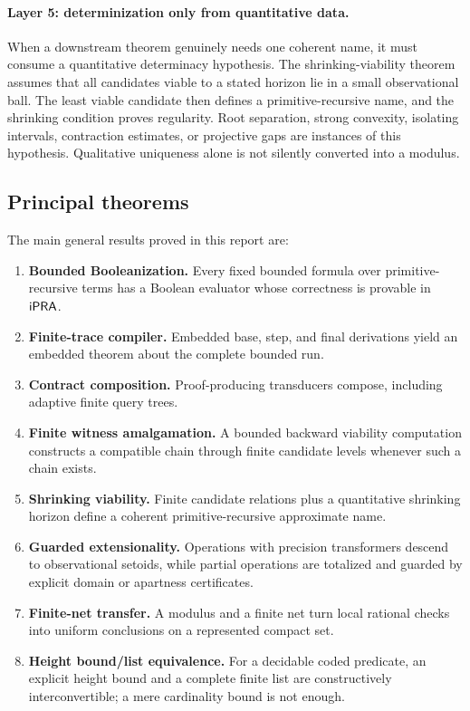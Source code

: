 \paragraph{Layer 5: determinization only from quantitative data.}
When a downstream theorem genuinely needs one coherent name, it must consume a
quantitative determinacy hypothesis.  The shrinking-viability theorem assumes
that all candidates viable to a stated horizon lie in a small observational
ball.  The least viable candidate then defines a primitive-recursive name, and
the shrinking condition proves regularity.  Root separation, strong convexity,
isolating intervals, contraction estimates, or projective gaps are instances
of this hypothesis.  Qualitative uniqueness alone is not silently converted
into a modulus.

\subsection{Principal theorems}

The main general results proved in this report are:

\begin{enumerate}[label=\textbf{T\arabic*.},leftmargin=4em]
\item \textbf{Bounded Booleanization.} Every fixed bounded formula over
      primitive-recursive terms has a Boolean evaluator whose correctness is
      provable in \(\mathsf{iPRA}\).
\item \textbf{Finite-trace compiler.} Embedded base, step, and final
      derivations yield an embedded theorem about the complete bounded run.
\item \textbf{Contract composition.} Proof-producing transducers compose,
      including adaptive finite query trees.
\item \textbf{Finite witness amalgamation.} A bounded backward viability
      computation constructs a compatible chain through finite candidate
      levels whenever such a chain exists.
\item \textbf{Shrinking viability.} Finite candidate relations plus a
      quantitative shrinking horizon define a coherent primitive-recursive
      approximate name.
\item \textbf{Guarded extensionality.} Operations with precision transformers
      descend to observational setoids, while partial operations are totalized
      and guarded by explicit domain or apartness certificates.
\item \textbf{Finite-net transfer.} A modulus and a finite net turn local
      rational checks into uniform conclusions on a represented compact set.
\item \textbf{Height bound/list equivalence.} For a decidable coded predicate,
      an explicit height bound and a complete finite list are constructively
      interconvertible; a mere cardinality bound is not enough.
\end{enumerate}

